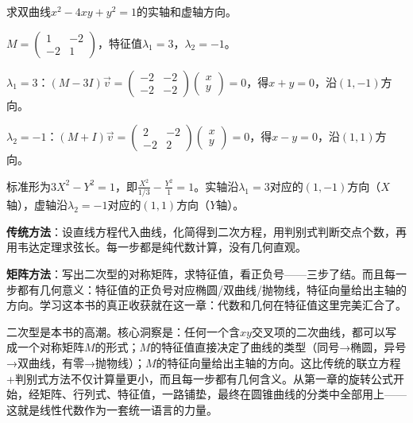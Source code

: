 \begin{example}
求双曲线$x^2-4xy+y^2=1$的实轴和虚轴方向。
\end{example}
\begin{solution}
$M=\begin{pmatrix}1&-2\\-2&1\end{pmatrix}$，特征值$\lambda_1=3$，$\lambda_2=-1$。

$\lambda_1=3$：$(M-3I)\vec v=\begin{pmatrix}-2&-2\\-2&-2\end{pmatrix}\begin{pmatrix}x\\y\end{pmatrix}=0$，得$x+y=0$，沿$(1,-1)$方向。

$\lambda_2=-1$：$(M+I)\vec v=\begin{pmatrix}2&-2\\-2&2\end{pmatrix}\begin{pmatrix}x\\y\end{pmatrix}=0$，得$x-y=0$，沿$(1,1)$方向。

标准形为$3X^2-Y^2=1$，即$\frac{X^2}{1/3}-\frac{Y^2}{1}=1$。实轴沿$\lambda_1=3$对应的$(1,-1)$方向（$X$轴），虚轴沿$\lambda_2=-1$对应的$(1,1)$方向（$Y$轴）。
\end{solution}


\textbf{传统方法}：设直线方程代入曲线，化简得到二次方程，用判别式判断交点个数，再用韦达定理求弦长。每一步都是纯代数计算，没有几何直观。

\textbf{矩阵方法}：写出二次型的对称矩阵，求特征值，看正负号——三步了结。而且每一步都有几何意义：特征值的正负号对应椭圆/双曲线/抛物线，特征向量给出主轴的方向。学习这本书的真正收获就在这一章：代数和几何在特征值这里完美汇合了。


二次型是本书的高潮。核心洞察是：任何一个含$xy$交叉项的二次曲线，都可以写成一个对称矩阵$M$的形式；$M$的特征值直接决定了曲线的类型（同号→椭圆，异号→双曲线，有零→抛物线）；$M$的特征向量给出主轴的方向。这比传统的联立方程+判别式方法不仅计算量更小，而且每一步都有几何含义。从第一章的旋转公式开始，经矩阵、行列式、特征值，一路铺垫，最终在圆锥曲线的分类中全部用上——这就是线性代数作为一套统一语言的力量。


